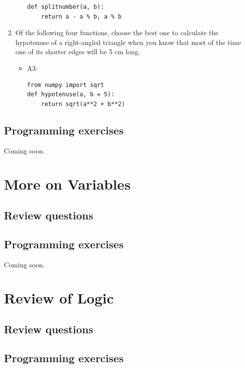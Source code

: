 \documentclass[article,A4,12pt]{llncs}
\begin{document}
\begin{enumerate}
\begin{itemize}
\begin{verbatim}
def splitnumber(a, b):
    return a - a % b, a % b
\end{verbatim}
  \end{itemize}
\item Of the following four functions, choose the best one to calculate the hypotenuse
      of a right-angled triangle when you know that most of the time one of its shorter
      edges will be 5 cm long.
  \begin{itemize}
    \item A3:
\begin{verbatim}
from numpy import sqrt
def hypotenuse(a, b = 5):
    return sqrt(a**2 + b**2)
\end{verbatim}
  \end{itemize}
\end{enumerate}


\subsection{Programming exercises}

Coming soon.


\section{More on Variables}

\subsection{Review questions}

\subsection{Programming exercises}

Coming soon.


\section{Review of Logic}

\subsection{Review questions}

\subsection{Programming exercises}
\end{document}
